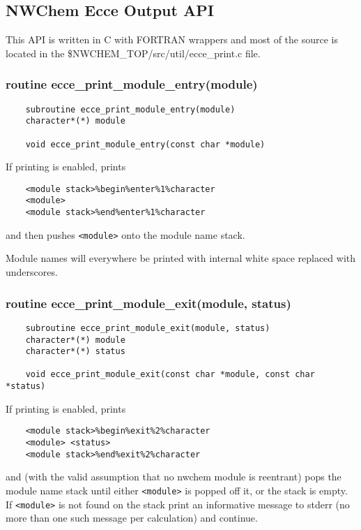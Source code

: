 \subsection{NWChem Ecce Output API}

This API is written in C with FORTRAN wrappers and most of the source is 
located in the 
\$NWCHEM\_TOP/src/util/ecce\_print.c file.

\subsubsection{  routine ecce\_print\_module\_entry(module)}

\begin{verbatim}
    subroutine ecce_print_module_entry(module)
    character*(*) module

    void ecce_print_module_entry(const char *module)
\end{verbatim} 
If printing is enabled, prints

\begin{verbatim}
    <module stack>%begin%enter%1%character
    <module>
    <module stack>%end%enter%1%character
\end{verbatim}
    and then pushes \texttt{<module>} onto the module name stack.  

    Module names will everywhere be printed with internal white space 
    replaced with underscores.

\subsubsection{routine ecce\_print\_module\_exit(module, status)}

\begin{verbatim}
    subroutine ecce_print_module_exit(module, status)
    character*(*) module
    character*(*) status

    void ecce_print_module_exit(const char *module, const char *status)
\end{verbatim}

    If printing is enabled, prints

\begin{verbatim}
    <module stack>%begin%exit%2%character
    <module> <status>
    <module stack>%end%exit%2%character
\end{verbatim}
    and (with the valid assumption that no nwchem module is reentrant) 
    pops the module name stack until either \texttt{<module>} is popped
    off it, or the stack is empty.  If \texttt{<module>} is not found on
    the stack print an informative message to stderr (no more than
    one such message per calculation) and continue.

